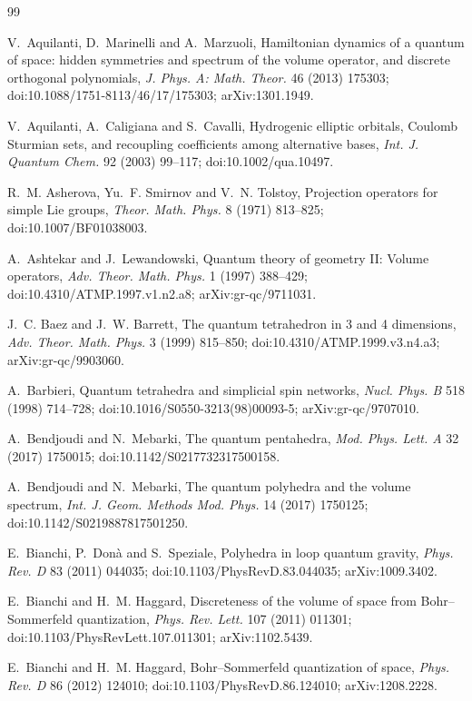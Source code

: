 \begin{thebibliography}{99}\small

V.~Aquilanti, D.~Marinelli and A.~Marzuoli, Hamiltonian dynamics of a quantum of space:
hidden symmetries and spectrum of the volume operator, and discrete orthogonal polynomials,
\emph{J. Phys. A: Math. Theor.} 46 (2013) 175303; doi:10.1088/1751-8113/46/17/175303;
arXiv:1301.1949.

V.~Aquilanti, A.~Caligiana and S.~Cavalli, Hydrogenic elliptic orbitals, Coulomb Sturmian sets,
and recoupling coefficients among alternative bases, \emph{Int. J. Quantum Chem.} 92 (2003)
99--117; doi:10.1002/qua.10497.

R.~M. Asherova, Yu.~F. Smirnov and V.~N. Tolstoy, Projection operators for simple Lie groups,
\emph{Theor. Math. Phys.} 8 (1971) 813--825; doi:10.1007/BF01038003.

A.~Ashtekar and J.~Lewandowski, Quantum theory of geometry II: Volume operators,
\emph{Adv. Theor. Math. Phys.} 1 (1997) 388--429; doi:10.4310/ATMP.1997.v1.n2.a8;
arXiv:gr-qc/9711031.

J.~C. Baez and J.~W. Barrett, The quantum tetrahedron in 3 and 4 dimensions,
\emph{Adv. Theor. Math. Phys.} 3 (1999) 815--850; doi:10.4310/ATMP.1999.v3.n4.a3;
arXiv:gr-qc/9903060.

A.~Barbieri, Quantum tetrahedra and simplicial spin networks, \emph{Nucl. Phys. B} 518 (1998)
714--728; doi:10.1016/S0550-3213(98)00093-5; arXiv:gr-qc/9707010.

A.~Bendjoudi and N.~Mebarki, The quantum pentahedra, \emph{Mod. Phys. Lett. A} 32 (2017)
1750015; doi:10.1142/S0217732317500158.

A.~Bendjoudi and N.~Mebarki, The quantum polyhedra and the volume spectrum,
\emph{Int. J. Geom. Methods Mod. Phys.} 14 (2017) 1750125; doi:10.1142/S0219887817501250.

E.~Bianchi, P.~Don\`a and S.~Speziale, Polyhedra in loop quantum gravity, \emph{Phys. Rev. D}
83 (2011) 044035; doi:10.1103/PhysRevD.83.044035; arXiv:1009.3402.

E.~Bianchi and H.~M. Haggard, Discreteness of the volume of space from Bohr--Sommerfeld
quantization, \emph{Phys. Rev. Lett.} 107 (2011) 011301; doi:10.1103/PhysRevLett.107.011301;
arXiv:1102.5439.

E.~Bianchi and H.~M. Haggard, Bohr--Sommerfeld quantization of space, \emph{Phys. Rev. D} 86
(2012) 124010; doi:10.1103/PhysRevD.86.124010; arXiv:1208.2228.


\end{thebibliography}
